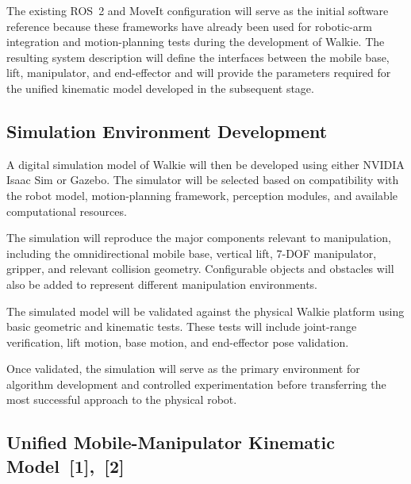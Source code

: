 \documentclass[12pt,a4paper]{article}
\newcommand{\figplaceholder}[2]{%
  \fbox{\begin{minipage}[c][#2][c]{#1}
    \centering \textit{[ Image placeholder ]}
  \end{minipage}}%
}
\begin{document}
The existing ROS~2 and MoveIt configuration will serve as the initial software reference
because these frameworks have already been used for robotic-arm integration and
motion-planning tests during the development of Walkie. The resulting system description will
define the interfaces between the mobile base, lift, manipulator, and end-effector and will
provide the parameters required for the unified kinematic model developed in the subsequent
stage.

\subsection*{Simulation Environment Development}

A digital simulation model of Walkie will then be developed using either NVIDIA Isaac
Sim or Gazebo. The simulator will be selected based on compatibility with the robot model,
motion-planning framework, perception modules, and available computational resources.

The simulation will reproduce the major components relevant to manipulation, including
the omnidirectional mobile base, vertical lift, 7-DOF manipulator, gripper, and relevant collision
geometry. Configurable objects and obstacles will also be added to represent different
manipulation environments.

The simulated model will be validated against the physical Walkie platform using basic
geometric and kinematic tests. These tests will include joint-range verification, lift motion, base
motion, and end-effector pose validation.


Once validated, the simulation will serve as the primary environment for algorithm
development and controlled experimentation before transferring the most successful approach
to the physical robot.

\subsection*{Unified Mobile-Manipulator Kinematic Model~[1],~[2]}
\end{document}
